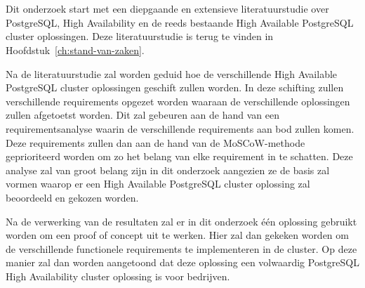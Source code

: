 
\chapter{}
\label{ch:methodologie}


Dit onderzoek start met een diepgaande en extensieve literatuurstudie over PostgreSQL, High Availability en de reeds bestaande High Available PostgreSQL cluster oplossingen. Deze literatuurstudie is terug te vinden in Hoofdstuk~\ref{ch:stand-van-zaken}.

Na de literatuurstudie zal worden geduid hoe de verschillende High Available PostgreSQL cluster oplossingen geschift zullen worden. In deze schifting zullen verschillende requirements opgezet worden waaraan de verschillende oplossingen zullen afgetoetst worden. Dit zal gebeuren aan de hand van een requirementsanalyse waarin de verschillende requirements aan bod zullen komen. Deze requirements zullen dan aan de hand van de MoSCoW-methode geprioriteerd worden om zo het belang van elke requirement in te schatten. Deze analyse zal van groot belang zijn in dit onderzoek aangezien ze de basis zal vormen waarop er een High Available PostgreSQL cluster oplossing zal beoordeeld en gekozen worden.

Na de verwerking van de resultaten zal er in dit onderzoek één oplossing gebruikt worden om een proof of concept uit te werken. Hier zal dan gekeken worden om de verschillende functionele requirements te implementeren in de cluster. Op deze manier zal dan worden aangetoond dat deze oplossing een volwaardig PostgreSQL High Availability cluster oplossing is voor bedrijven.%

